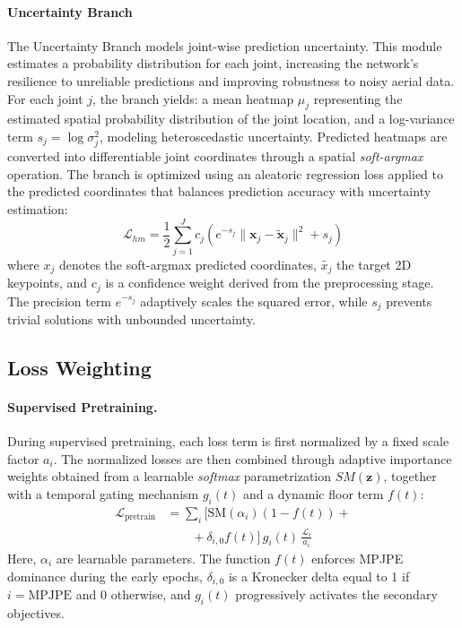 \documentclass[11pt,a4paper,twocolumn]{article}
\begin{document}
\paragraph{Uncertainty Branch}
The Uncertainty Branch models joint-wise prediction uncertainty. This module estimates a probability distribution for each joint, increasing the network's resilience to unreliable predictions and improving robustness to noisy aerial 
data. For each joint $j$, the branch yields: 
a mean heatmap $\mu_j$ representing the estimated spatial probability distribution of the joint location, and a log-variance term $s_j = \log \sigma^2_j$, modeling heteroscedastic uncertainty.
Predicted heatmaps are converted into differentiable joint coordinates through a spatial \textit{soft-argmax} operation.
The branch is optimized using an aleatoric regression loss applied to the predicted coordinates that balances prediction accuracy with uncertainty estimation:
\begin{equation}
    \mathcal{L}_{hm} = \frac{1}{2}\sum_{j=1}^{J} c_j \left( e^{-s_j} \| \mathbf{x}_j - \tilde{\mathbf{x}}_j \|^2 + s_j \right)
\end{equation}
where $x_j$ denotes the soft-argmax predicted coordinates, $\tilde{x_j}$ the target 2D keypoints, and $c_j$ is a confidence weight derived from the preprocessing stage. The precision term $e^{-s_j}$
adaptively scales the squared error, while $s_j$ prevents trivial solutions with unbounded uncertainty.

\subsection{Loss Weighting}
\paragraph{Supervised Pretraining.}
During supervised pretraining, each loss term is first normalized by a fixed scale factor $a_i$. The normalized losses are then combined through adaptive importance weights obtained from a learnable \textit{softmax} parametrization 
$SM(\mathbf{z})$, together with a temporal gating mechanism $g_i(t)$ and a dynamic floor term $f(t)$:
\begin{equation} 
    \begin{aligned} 
        \mathcal{L}_{\text{pretrain}} &= \sum_{i} \Big[ \mathrm{SM}(\alpha_i) (1 - f(t)) +
        \\ &\qquad + \delta_{i,0} f(t) \Big] \, g_i(t) \, \frac{\mathcal{L}_i}{a_i} 
    \end{aligned} 
\end{equation}
Here, $\alpha_i$ are learnable parameters. The function $f(t)$ enforces MPJPE dominance during the early epochs, $\delta_{i,0}$ is a Kronecker delta equal to 1 if $i=\text{MPJPE}$ and 0 otherwise, and $g_i(t)$ progressively activates the secondary objectives.
\end{document}
